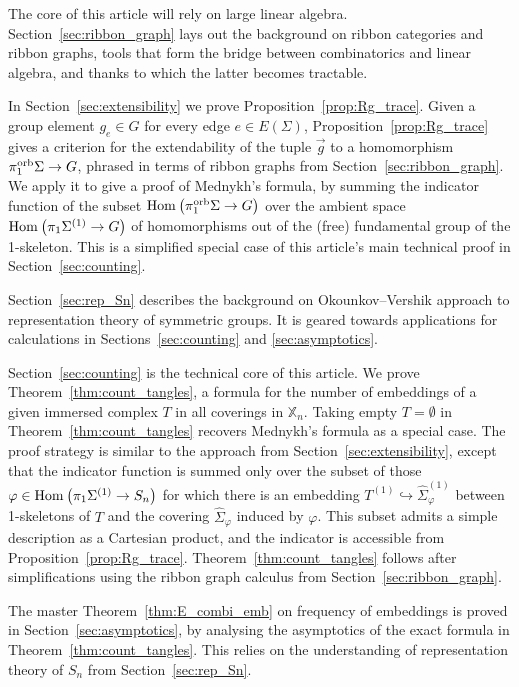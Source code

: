 \documentclass{amsart}
\newcommand{\covers}{\mathbb{X}_n}
\newcommand{\Hom}[3][]{\tn{Hom}_{#1}\left(#2\to #3\right)}
\newcommand{\pio}{\pi_1^{\textnormal{orb}}}
\newcommand{\tn}{\textnormal}
\newcommand{\whS}{{\widehat{\Sigma}}}
\begin{document}
The core of this article will rely on large linear algebra. Section~\ref{sec:ribbon_graph} lays out the background on ribbon categories and ribbon graphs, tools that form the bridge between combinatorics and linear algebra, and thanks to which the latter becomes tractable.

In Section~\ref{sec:extensibility} we prove Proposition~\ref{prop:Rg_trace}. Given a group element $g_e\in G$ for every edge $e\in E(\Sigma)$, Proposition~\ref{prop:Rg_trace} gives a criterion for the extendability of the tuple $\vec{g}$ to a homomorphism $\pio\Sigma\to G$, phrased in terms of ribbon graphs from Section~\ref{sec:ribbon_graph}. We apply it to give a proof of Mednykh's formula, by summing the indicator function of the subset $\Hom{\pio\Sigma}{G}$ over the ambient space $\Hom{\pi_1\Sigma^{(1)}}{G}$ of homomorphisms out of the (free) fundamental group of the 1-skeleton. This is a simplified special case of this article's main technical proof in Section~\ref{sec:counting}.

Section~\ref{sec:rep_Sn} describes the background on Okounkov--Vershik approach to representation theory of symmetric groups. It is geared towards applications for calculations in Sections~\ref{sec:counting} and \ref{sec:asymptotics}.

Section~\ref{sec:counting} is the technical core of this article. We prove Theorem~\ref{thm:count_tangles}, a formula for the number of embeddings of a given immersed complex $T$ in all coverings in $\covers$. Taking empty $T=\emptyset$ in Theorem~\ref{thm:count_tangles} recovers Mednykh's formula as a special case. The proof strategy is similar to the approach from Section~\ref{sec:extensibility}, except that the indicator function is summed only over the subset of those $\varphi\in\Hom{\pi_1\Sigma^{(1)}}{S_n}$ for which there is an embedding $T^{(1)}\hookrightarrow\whS^{(1)}_\varphi$ between 1-skeletons of $T$ and the covering $\whS_\varphi$ induced by $\varphi$. This subset admits a simple description as a Cartesian product, and the indicator is accessible from Proposition~\ref{prop:Rg_trace}. Theorem~\ref{thm:count_tangles} follows after simplifications using the ribbon graph calculus from Section~\ref{sec:ribbon_graph}.

The master Theorem~\ref{thm:E_combi_emb} on frequency of embeddings is proved in Section~\ref{sec:asymptotics}, by analysing the asymptotics of the exact formula in Theorem~\ref{thm:count_tangles}. This relies on the understanding of representation theory of $S_n$ from Section~\ref{sec:rep_Sn}.
\end{document}
